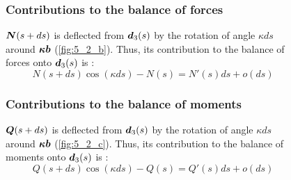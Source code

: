 \begin{figure}[p]
	\begin{fullpage}
	\subsubsection{Contributions to the balance of forces}
	\vspace{10pt}
	$\boldsymbol{N}(s+ds)$ is deflected from $\boldsymbol{d}_3(s)$ by the rotation of angle $\kappa ds$ around $\boldsymbol{\kappa b}$ (\cref{fig:5_2_b}). Thus, its contribution to the balance of forces onto $\boldsymbol{d}_3(s)$ is : 
	\begin{equation*}
		N(s+ds) \cos(\kappa ds) - N(s) = N'(s) ds + o(ds)
	\end{equation*}	
	\vspace{10pt}
	
	\subsubsection{Contributions to the balance of moments}
	\vspace{10pt}
	$\boldsymbol{Q}(s+ds)$ is deflected from $\boldsymbol{d}_3(s)$ by the rotation of angle $\kappa ds$ around $\boldsymbol{\kappa b}$ (\cref{fig:5_2_c}). Thus, its contribution to the balance of moments onto $\boldsymbol{d}_3(s)$ is : 
	\begin{equation*}
		Q(s+ds) \cos(\kappa ds) - Q(s) = Q'(s) ds + o(ds)
	\end{equation*}	
	  \end{fullpage}
\end{figure}

 
